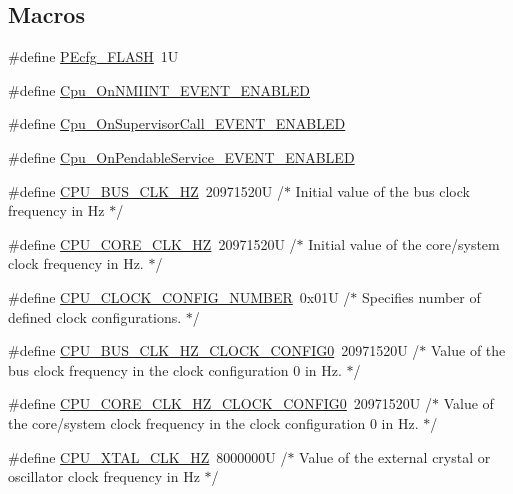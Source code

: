 \subsection*{Macros}
\begin{DoxyCompactItemize}
\item 
\#define \hyperlink{group___cpu__module_gae2f84b335ab99b9e98d41e8a530b1540}{P\+Ecfg\+\_\+\+F\+L\+A\+SH}~1U
\item 
\#define \hyperlink{group___cpu__module_gabd20462878cd6205dd20d3303b46b3cb}{Cpu\+\_\+\+On\+N\+M\+I\+I\+N\+T\+\_\+\+E\+V\+E\+N\+T\+\_\+\+E\+N\+A\+B\+L\+ED}
\item 
\#define \hyperlink{group___cpu__module_ga0e4d17f17aeb5bd8ac49a0a499b9e0ff}{Cpu\+\_\+\+On\+Supervisor\+Call\+\_\+\+E\+V\+E\+N\+T\+\_\+\+E\+N\+A\+B\+L\+ED}
\item 
\#define \hyperlink{group___cpu__module_gaefd1f85b3e11fb325cc6413fb95ead9b}{Cpu\+\_\+\+On\+Pendable\+Service\+\_\+\+E\+V\+E\+N\+T\+\_\+\+E\+N\+A\+B\+L\+ED}
\item 
\#define \hyperlink{group___cpu__module_ga532954dc988486bfe48200c796380120}{C\+P\+U\+\_\+\+B\+U\+S\+\_\+\+C\+L\+K\+\_\+\+HZ}~20971520\+U /$\ast$ Initial value of the bus clock frequency in Hz $\ast$/
\item 
\#define \hyperlink{group___cpu__module_ga9dee0abd722c849e54c662ab11a1d2cf}{C\+P\+U\+\_\+\+C\+O\+R\+E\+\_\+\+C\+L\+K\+\_\+\+HZ}~20971520\+U /$\ast$ Initial value of the core/system clock frequency in Hz.  $\ast$/
\item 
\#define \hyperlink{group___cpu__module_ga37d43e31f65dd620040aec363e95b5a8}{C\+P\+U\+\_\+\+C\+L\+O\+C\+K\+\_\+\+C\+O\+N\+F\+I\+G\+\_\+\+N\+U\+M\+B\+ER}~0x01\+U /$\ast$ Specifies number of defined clock configurations. $\ast$/
\item 
\#define \hyperlink{group___cpu__module_ga39018ca5854bea36700d3b30f6c08195}{C\+P\+U\+\_\+\+B\+U\+S\+\_\+\+C\+L\+K\+\_\+\+H\+Z\+\_\+\+C\+L\+O\+C\+K\+\_\+\+C\+O\+N\+F\+I\+G0}~20971520\+U /$\ast$ Value of the bus clock frequency in the clock configuration 0 in Hz. $\ast$/
\item 
\#define \hyperlink{group___cpu__module_ga64b9007ea0c78e588ed565373bcec805}{C\+P\+U\+\_\+\+C\+O\+R\+E\+\_\+\+C\+L\+K\+\_\+\+H\+Z\+\_\+\+C\+L\+O\+C\+K\+\_\+\+C\+O\+N\+F\+I\+G0}~20971520\+U /$\ast$ Value of the core/system clock frequency in the clock configuration 0 in Hz. $\ast$/
\item 
\#define \hyperlink{group___cpu__module_gacf80ae1c70da6f1932185345fb089ce2}{C\+P\+U\+\_\+\+X\+T\+A\+L\+\_\+\+C\+L\+K\+\_\+\+HZ}~8000000\+U /$\ast$ Value of the external crystal or oscillator clock frequency in Hz $\ast$/

\end{DoxyCompactItemize}

